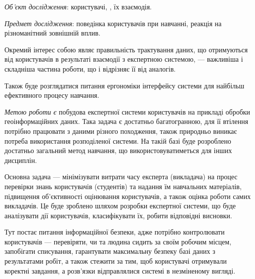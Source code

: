 


\textit{Об’єкт дослідження}:
користувачі, , їх взаємодія.

\textit{Предмет дослідження}:
поведінка користувачів при навчанні, реакція на різноманітний зовнішній вплив.

Окремий інтерес собою являє правильність трактування даних, що отримуються від
користувачів в результаті взаємодії з експертною системою, --- важливіша і
складніша частина роботи, що і відрізняє її від аналогів.

Також буде розглядатися питання
ергономіки інтерфейсу системи для найбільш ефективного процесу навчання.

\textit{Метою роботи є}
побудова експертної системи 
користувачів на прикладі обробки геоінформаційних даних.
Така задача є достатньо багатогранною, для її втілення потрібно працювати
з даними різного походження, також природньо виникає потреба використання
розподіленої системи.
На такій базі буде розроблено достатньо загальний метод навчання,
що використовуватиметься для інших дисциплін.

Основна задача --- мінімізувати витрати часу експерта (викладача) на процес
перевірки знань користувачів (студентів) та надання їм навчальних матеріалів,
підвищення об’єктивності оцінювання користувачів, а також оцінка роботи
самих викладачів.
Це буде зроблено шляхом розробки експертної системи, що буде аналізувати дії
користувачів, класифікувати їх, робити відповідні висновки.

Тут постає питання інформаційної безпеки, адже потрібно контролювати
користувачів --- перевіряти, чи та людина сидить за своїм робочим місцем,
запобігати списування, гарантувати максимальну безпеку базі даних з
результатами робіт, а також стежити за тим, щоб користувачі отримували коректні
завдання, а розв’язки відправлялися системі в незміненому вигляді.
